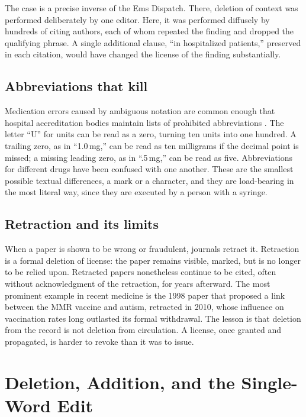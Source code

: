 \documentclass[11pt,a4paper]{article}
\theoremstyle{plain}
\theoremstyle{definition}
\theoremstyle{remark}
\begin{document}
The case is a precise inverse of the Ems Dispatch. There, deletion of context was performed deliberately by one editor. Here, it was performed diffusely by hundreds of citing authors, each of whom repeated the finding and dropped the qualifying phrase. A single additional clause, ``in hospitalized patients,'' preserved in each citation, would have changed the license of the finding substantially.

\subsection{Abbreviations that kill}

Medication errors caused by ambiguous notation are common enough that hospital accreditation bodies maintain lists of prohibited abbreviations \cite{jointcommission}. The letter ``U'' for units can be read as a zero, turning ten units into one hundred. A trailing zero, as in ``1.0\,mg,'' can be read as ten milligrams if the decimal point is missed; a missing leading zero, as in ``.5\,mg,'' can be read as five. Abbreviations for different drugs have been confused with one another. These are the smallest possible textual differences, a mark or a character, and they are load-bearing in the most literal way, since they are executed by a person with a syringe.

\subsection{Retraction and its limits}

When a paper is shown to be wrong or fraudulent, journals retract it. Retraction is a formal deletion of license: the paper remains visible, marked, but is no longer to be relied upon. Retracted papers nonetheless continue to be cited, often without acknowledgment of the retraction, for years afterward. The most prominent example in recent medicine is the 1998 paper that proposed a link between the MMR vaccine and autism, retracted in 2010, whose influence on vaccination rates long outlasted its formal withdrawal. The lesson is that deletion from the record is not deletion from circulation. A license, once granted and propagated, is harder to revoke than it was to issue.

\section{Deletion, Addition, and the Single-Word Edit}\label{sec:deletion}
\end{document}
